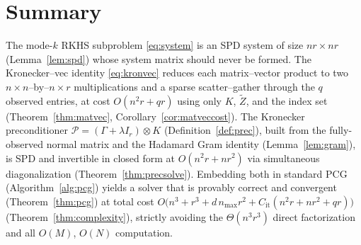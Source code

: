\documentclass[12pt]{article}
\begin{document}
\section{Summary}

The mode-$k$ RKHS subproblem \eqref{eq:system} is an SPD system of size
$nr\times nr$ (Lemma~\ref{lem:spd}) whose system matrix should never be formed.
The Kronecker--vec identity \eqref{eq:kronvec} reduces each matrix--vector product
to two $n\times n$--by--$n\times r$ multiplications and a sparse scatter--gather
through the $q$ observed entries, at cost $O(n^2r+qr)$ using only
$K$, $\widetilde Z$, and the index set (Theorem~\ref{thm:matvec},
Corollary~\ref{cor:matveccost}). The Kronecker preconditioner
$\mathcal P=(\Gamma+\lambda I_r)\otimes K$ (Definition~\ref{def:prec}), built from
the fully-observed normal matrix and the Hadamard Gram identity
(Lemma~\ref{lem:gram}), is SPD and invertible in closed form at $O(n^2r+nr^2)$ via
simultaneous diagonalization (Theorem~\ref{thm:precsolve}). Embedding both in
standard PCG (Algorithm~\ref{alg:pcg}) yields a solver that is provably correct
and convergent (Theorem~\ref{thm:pcg}) at total cost
$O\!\big(n^3+r^3+d\,n_{\max}r^2+C_{\mathrm{it}}(n^2r+nr^2+qr)\big)$
(Theorem~\ref{thm:complexity}), strictly avoiding the $\Theta(n^3r^3)$ direct
factorization and all $O(M)$, $O(N)$ computation.
\end{document}

